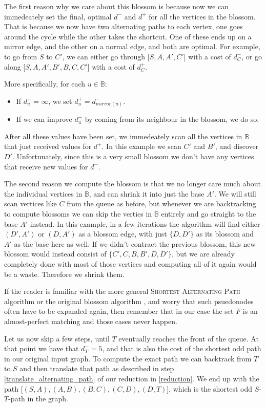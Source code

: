The first reason why we care about this blossom is because now we can immedeately set the final, optimal $d^-$ and $d^+$ for all the vertices in the blossom. That is because we now have two alternating paths to each vertex, one goes around the cycle while the other takes the shortcut. One of these ends up on a mirror edge, and the other on a normal edge, and both are optimal. For example, to go from $S$ to $C'$, we can either go through [$S,A,A',C'$] with a cost of $d^-_C$, or go along [$S,A,A',B',B,C,C'$] with a cost of $d^+_C$.

More specifically, for each $u \in \mathbb{B}$: \begin{itemize}
    \item If $d^+_u = \infty$, we set $d^+_u = d^-_{mirror(u)}$.
    \item If we can improve $d^-_u$ by coming from its neighbour in the blossom, we do so.
\end{itemize}
After all these values have been set, we immedeately scan all the vertices in $\mathbb{B}$ that just received values for $d^+$. In this example we scan $C'$ and $B'$, and discover $D'$. Unfortunately, since this is a very small blossom we don't have any vertices that receive new values for $d^-$.



The second reason we compute the blossom is that we no longer care much about the individual vertices in $\mathbb{B}$, and can shrink it into just the base $A'$. We will still scan vertices like $C$ from the queue as before, but whenever we are backtracking to compute blossoms we can skip the verties in $\mathbb{B}$ entirely and go straight to the base $A'$ instead. In this example, in a few iterations the algorithm will find either $(D',A')$ or $(D,A')$ as a blossom edge, with just $\{D,D'\}$ as its blossom and $A'$ as the base here as well. If we didn't contract the previous blossom, this new blossom would instead consist of $\{C',C,B,B',D,D'\}$, but we are already completely done with most of those vertices and computing all of it again would be a waste. Therefore we shrink them. 

If the reader is familiar with the more general \textsc{Shortest Alternating Path} algorithm \cite{shortest_alternating_path} or the original blossom algorithm \cite{blossom}, and worry that such psuedonodes often have to be expanded again, then remember that in our case the set $F$ is an almost-perfect matching and those cases never happen. %



Let us now skip a few steps, until $T$ eventually reaches the front of the queue. At that point we have that $d^-_T = 5$, and that is also the cost of the shortest odd path in our original input graph. To compute the exact path we can backtrack from $T$ to $S$ and then translate that path as described in step \ref{translate_alternating_path} of our reduction in \ref{reduction}. We end up with the path [$(S,A),(A,B),(B,C),(C,D),(D,T)$], which is the shortest odd $S$-$T$-path in the graph.
